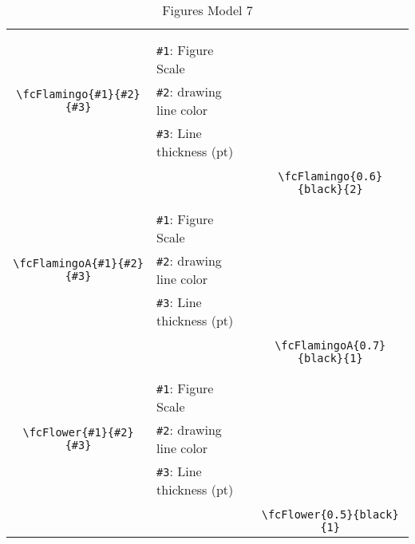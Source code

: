 \documentclass{article}
\begin{document}
\begin{table}[H]
\begin{tabular}{|c|l|c|}
	&&\multirow{5}{*}{\fcFlamingo{0.6}{black}{2}}\\	&&\\	&\verb|#1|: Figure Scale &\\	\verb|\fcFlamingo{#1}{#2}{#3}|&	\verb|#2|: drawing line color &\\	&\verb|#3|: Line thickness (pt) &\\ &&\\&&	\verb|\fcFlamingo{0.6}{black}{2}|\\\hline 	
	&&\multirow{5}{*}{\fcFlamingoA{0.7}{black}{1}}\\	&&\\	&\verb|#1|: Figure Scale &\\	\verb|\fcFlamingoA{#1}{#2}{#3}|&	\verb|#2|: drawing line color &\\	&\verb|#3|: Line thickness (pt) &\\ &&\\&&	\verb|\fcFlamingoA{0.7}{black}{1}|\\\hline 	
	&&\multirow{5}{*}{\fcFlower{0.5}{black}{1}}\\	&&\\	&\verb|#1|: Figure Scale &\\	\verb|\fcFlower{#1}{#2}{#3}|&	\verb|#2|: drawing line color &\\	&\verb|#3|: Line thickness (pt) &\\ &&\\&&	\verb|\fcFlower{0.5}{black}{1}|\\\hline 	\hline\end{tabular}\caption{Figures Model 7}\label{tab7}\end{table}
\end{document}
